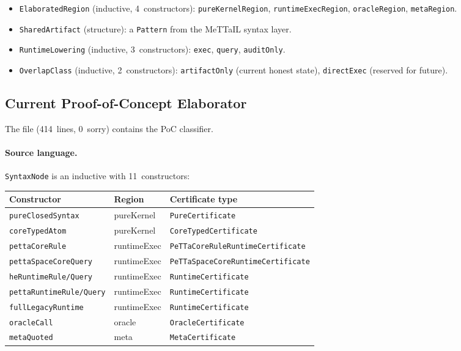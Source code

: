 \documentclass[11pt]{article}
\theoremstyle{remark}
\newcommand{\MeTTaIL}{\textup{MeTTaIL}}
\newcommand{\code}[1]{\texttt{#1}}
\newcommand{\codepath}[1]{\path{#1}}
\newcommand{\leanref}[1]{\texttt{#1}}
\begin{document}
\begin{itemize}[nosep]
  \item \leanref{ElaboratedRegion} (inductive, 4~constructors):
  \code{pureKernelRegion}, \code{runtimeExecRegion}, \code{oracleRegion},
  \code{metaRegion}.
  \item \leanref{SharedArtifact} (structure):
  a \leanref{Pattern} from the \MeTTaIL{} syntax layer.
  \item \leanref{RuntimeLowering} (inductive, 3~constructors):
  \code{exec}, \code{query}, \code{auditOnly}.
  \item \leanref{OverlapClass} (inductive, 2~constructors):
  \code{artifactOnly} (current honest state),
  \code{directExec} (reserved for future).
\end{itemize}

\subsection{Current Proof-of-Concept Elaborator}

The file \codepath{ElaboratedCore.lean} (414~lines, 0~sorry)
contains the PoC classifier.

\paragraph{Source language.}
\leanref{SyntaxNode} is an inductive with 11~constructors:

\begin{center}
\small
\begin{tabular}{@{}lll@{}}
\toprule
Constructor & Region & Certificate type \\
\midrule
\code{pureClosedSyntax} & pureKernel & \leanref{PureCertificate} \\
\code{coreTypedAtom} & pureKernel & \leanref{CoreTypedCertificate} \\
\code{pettaCoreRule} & runtimeExec & \leanref{PeTTaCoreRuleRuntimeCertificate} \\
\code{pettaSpaceCoreQuery} & runtimeExec & \leanref{PeTTaSpaceCoreRuntimeCertificate} \\
\code{heRuntimeRule/Query} & runtimeExec & \leanref{RuntimeCertificate} \\
\code{pettaRuntimeRule/Query} & runtimeExec & \leanref{RuntimeCertificate} \\
\code{fullLegacyRuntime} & runtimeExec & \leanref{RuntimeCertificate} \\
\code{oracleCall} & oracle & \leanref{OracleCertificate} \\
\code{metaQuoted} & meta & \leanref{MetaCertificate} \\
\bottomrule
\end{tabular}
\end{center}
\end{document}
